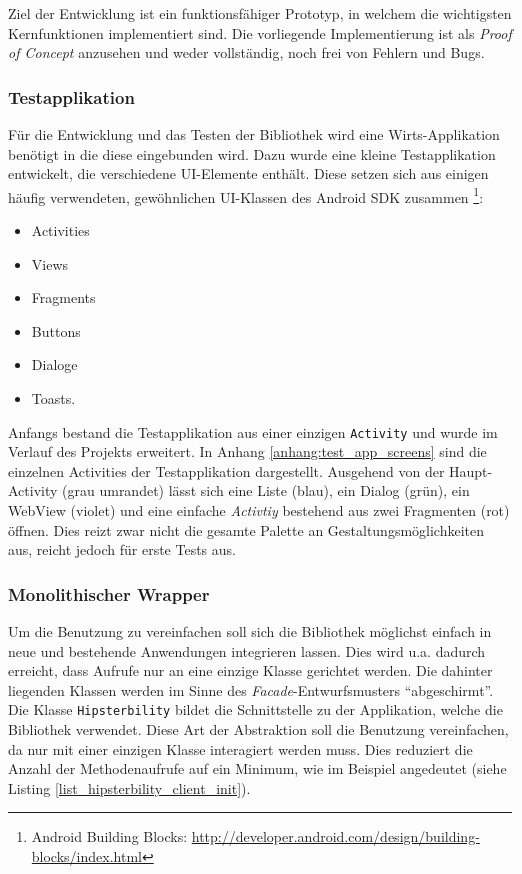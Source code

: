 Ziel der Entwicklung ist ein funktionsfähiger Prototyp, in welchem die wichtigsten Kernfunktionen implementiert sind.
Die vorliegende Implementierung ist als \emph{Proof of Concept} anzusehen und weder vollständig, noch frei von Fehlern und Bugs.

\subsubsection{Testapplikation}
Für die Entwicklung und das Testen der Bibliothek wird eine Wirts-Applikation benötigt in die diese eingebunden wird.
Dazu wurde eine kleine Testapplikation entwickelt, die verschiedene \ac{UI}-Elemente enthält.
Diese setzen sich aus einigen häufig verwendeten, gewöhnlichen \ac{UI}-Klassen des Android SDK zusammen \footnote{Android Building Blocks: \url{http://developer.android.com/design/building-blocks/index.html}}:
\begin{itemize}
	\item Activities
	\item Views
	\item Fragments
	\item Buttons
	\item Dialoge
	\item Toasts.
\end{itemize}
Anfangs bestand die Testapplikation aus einer einzigen \texttt{Activity} und wurde im Verlauf des Projekts erweitert.
In Anhang \ref{anhang:test_app_screens} sind die einzelnen Activities der Testapplikation dargestellt.
Ausgehend von der Haupt-Activity (grau umrandet) lässt sich eine Liste (blau), ein Dialog (grün), ein WebView (violet) und eine einfache \emph{Activtiy} bestehend aus zwei Fragmenten (rot) öffnen.
Dies reizt zwar nicht die gesamte Palette an Gestaltungsmöglichkeiten aus, reicht jedoch für erste Tests aus.

\subsubsection{Monolithischer Wrapper\label{sec:monolithischer_wrapper}}
Um die Benutzung zu vereinfachen soll sich die Bibliothek möglichst einfach in neue und bestehende Anwendungen integrieren lassen.
Dies wird u.a. dadurch erreicht, dass Aufrufe nur an eine einzige Klasse gerichtet werden.
Die dahinter liegenden Klassen werden im Sinne des \emph{Facade}-Entwurfsmusters \cite[vgl.][40\psq]{designpattern} \enquote{abgeschirmt}.
Die Klasse \texttt{Hipsterbility} bildet die Schnittstelle zu der Applikation, welche die Bibliothek verwendet.
Diese Art der Abstraktion soll die Benutzung vereinfachen, da nur mit einer einzigen Klasse interagiert werden muss. 
Dies reduziert die Anzahl der Methodenaufrufe auf ein Minimum, wie im Beispiel angedeutet (siehe Listing \ref{list_hipsterbility_client_init}).

